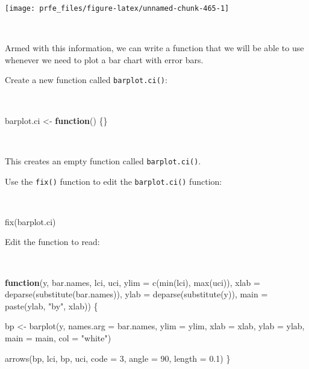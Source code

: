 \documentclass[
  12pt,
  a4paper]{book}
\newenvironment{Shaded}{\begin{snugshade}}{\end{snugshade}}
\newcommand{\AttributeTok}[1]{\textcolor[rgb]{0.77,0.63,0.00}{#1}}
\newcommand{\ControlFlowTok}[1]{\textcolor[rgb]{0.13,0.29,0.53}{\textbf{#1}}}
\newcommand{\DecValTok}[1]{\textcolor[rgb]{0.00,0.00,0.81}{#1}}
\newcommand{\FloatTok}[1]{\textcolor[rgb]{0.00,0.00,0.81}{#1}}
\newcommand{\FunctionTok}[1]{\textcolor[rgb]{0.00,0.00,0.00}{#1}}
\newcommand{\NormalTok}[1]{#1}
\newcommand{\OtherTok}[1]{\textcolor[rgb]{0.56,0.35,0.01}{#1}}
\newcommand{\StringTok}[1]{\textcolor[rgb]{0.31,0.60,0.02}{#1}}
\begin{document}
\newpage

\begin{center}\texttt{[image: prfe\_files/figure-latex/unnamed-chunk-465-1]} \end{center}

~

Armed with this information, we can write a function that we will be able to use whenever we need to plot a bar chart with error bars.

Create a new function called \texttt{barplot.ci()}:

~

\begin{Shaded}
\begin{Highlighting}[]
\NormalTok{barplot.ci }\OtherTok{\textless{}{-}} \ControlFlowTok{function}\NormalTok{() \{\}}
\end{Highlighting}
\end{Shaded}

~

This creates an empty function called \texttt{barplot.ci()}.

Use the \texttt{fix()} function to edit the \texttt{barplot.ci()} function:

~

\begin{Shaded}
\begin{Highlighting}[]
\FunctionTok{fix}\NormalTok{(barplot.ci)}
\end{Highlighting}
\end{Shaded}

\newpage

Edit the function to read:

~

\begin{Shaded}
\begin{Highlighting}[]
\ControlFlowTok{function}\NormalTok{(y, bar.names, lci, uci,}
         \AttributeTok{ylim =} \FunctionTok{c}\NormalTok{(}\FunctionTok{min}\NormalTok{(lci), }\FunctionTok{max}\NormalTok{(uci)),}
         \AttributeTok{xlab =} \FunctionTok{deparse}\NormalTok{(}\FunctionTok{substitute}\NormalTok{(bar.names)),}
         \AttributeTok{ylab =} \FunctionTok{deparse}\NormalTok{(}\FunctionTok{substitute}\NormalTok{(y)),}
         \AttributeTok{main =} \FunctionTok{paste}\NormalTok{(ylab, }\StringTok{"by"}\NormalTok{, xlab)) \{}
     
\NormalTok{  bp }\OtherTok{\textless{}{-}} \FunctionTok{barplot}\NormalTok{(y, }\AttributeTok{names.arg =}\NormalTok{ bar.names, }\AttributeTok{ylim =}\NormalTok{ ylim, }\AttributeTok{xlab =}\NormalTok{ xlab,}
                \AttributeTok{ylab =}\NormalTok{ ylab, }\AttributeTok{main =}\NormalTok{ main, }\AttributeTok{col =} \StringTok{"white"}\NormalTok{)}
     
  \FunctionTok{arrows}\NormalTok{(bp, lci, bp, uci, }\AttributeTok{code =} \DecValTok{3}\NormalTok{, }\AttributeTok{angle =} \DecValTok{90}\NormalTok{, }\AttributeTok{length =} \FloatTok{0.1}\NormalTok{)}
\NormalTok{\}}
\end{Highlighting}
\end{Shaded}
\end{document}
